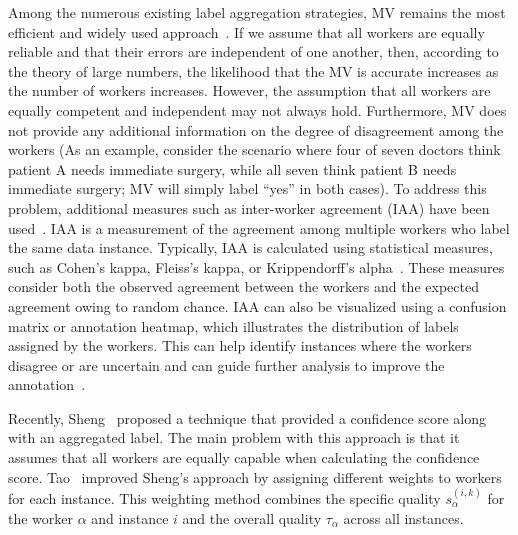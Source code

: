 \documentclass[sn-nature]{bst/sn-jnl}
\begin{document}
Among the numerous existing label aggregation strategies, MV remains the most efficient and widely used approach~\cite{tao_Label_2020}. If we assume that all workers are equally reliable and that their errors are independent of one another, then, according to the theory of large numbers, the likelihood that the MV is accurate increases as the number of workers increases. However, the assumption that all workers are equally competent and independent may not always hold. Furthermore, MV does not provide any additional information on the degree of disagreement among the workers (As an example, consider the scenario where four of seven doctors think patient A needs immediate surgery, while all seven think patient B needs immediate surgery; MV will simply label ``yes'' in both cases).
To address this problem, additional measures such as inter-worker agreement (IAA) have been used~\cite{artstein_InterAnnotator_2017}. IAA is a measurement of the agreement among multiple workers who label the same data instance. Typically, IAA is calculated using statistical measures, such as Cohen's kappa, Fleiss's kappa, or Krippendorff's alpha~\cite{krippendorff_Content_2018}. These measures consider both the observed agreement between the workers and the expected agreement owing to random chance. IAA can also be visualized using a confusion matrix or annotation heatmap, which illustrates the distribution of labels assigned by the workers. This can help identify instances where the workers disagree or are uncertain and can guide further analysis to improve the annotation~\cite{carletta_Assessing_1996}.

Recently, Sheng~\cite{sheng_Majority_2019} proposed a technique that provided a confidence score along with an aggregated label. The main problem with this approach is that it assumes that all workers are equally capable when calculating the confidence score. Tao~\cite{tao_Label_2020} improved Sheng's approach by assigning different weights to workers for each instance. This weighting method combines the specific quality $s_\alpha^{(i,k)} $ for the worker $\alpha $ and instance $i $ and the overall quality $\tau_\alpha$ across all instances.
\end{document}
